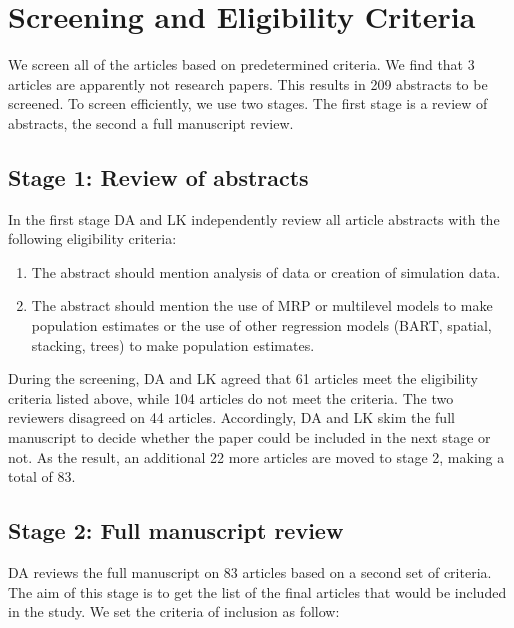 \documentclass{monashthesis}
\begin{document}
\hypertarget{screening-and-eligibility-criteria}{%
\section{Screening and Eligibility Criteria}\label{screening-and-eligibility-criteria}}

We screen all of the articles based on predetermined criteria. We find that 3 articles are apparently not research papers. This results in 209 abstracts to be screened. To screen efficiently, we use two stages. The first stage is a review of abstracts, the second a full manuscript review.

\hypertarget{stage-1-review-of-abstracts}{%
\subsection{Stage 1: Review of abstracts}\label{stage-1-review-of-abstracts}}

In the first stage DA and LK independently review all article abstracts with the following eligibility criteria:

\begin{enumerate}
\def\labelenumi{\arabic{enumi}.}
\tightlist
\item
  The abstract should mention analysis of data or creation of simulation data.
\item
  The abstract should mention the use of MRP or multilevel models to make population estimates or the use of other regression models (BART, spatial, stacking, trees) to make population estimates.
\end{enumerate}

During the screening, DA and LK agreed that 61 articles meet the eligibility criteria listed above, while 104 articles do not meet the criteria. The two reviewers disagreed on 44 articles. Accordingly, DA and LK skim the full manuscript to decide whether the paper could be included in the next stage or not. As the result, an additional 22 more articles are moved to stage 2, making a total of 83.

\hypertarget{stage-2-full-manuscript-review}{%
\subsection{Stage 2: Full manuscript review}\label{stage-2-full-manuscript-review}}

DA reviews the full manuscript on 83 articles based on a second set of criteria. The aim of this stage is to get the list of the final articles that would be included in the study. We set the criteria of inclusion as follow:
\end{document}
